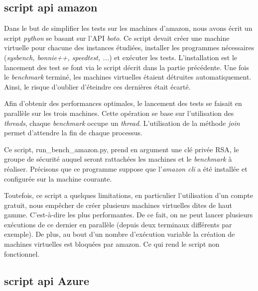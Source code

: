 \documentclass[11pt]{article}
\begin{document}
\subsection{script api amazon}
Dans le but de simplifier les tests sur les machines d'amazon,
nous avons écrit un script \textit{python} se basant sur l'API
\textit{boto}. Ce script devait créer une machine virtuelle pour chacune des instances étudiées, installer les programmes nécessaires (\textit{sysbench, bonnie++, speedtest, ...}) et exécuter les tests. L'installation est le lancement des test se font via le script décrit dans la partie précédente. Une fois le \textit{benchmark} terminé, les machines virtuelles étaient détruites automatiquement. Ainsi, le risque d'oublier d'éteindre ces dernières était écarté.

Afin d'obtenir des performances optimales, le lancement des tests se faisait en parallèle sur les trois machines. Cette opération se base sur l'utilisation des \textit{threads}, chaque \textit{benchmark} occupe un \textit{thread}. L'utilisation de la méthode \textit{join} permet d'attendre la fin de chaque processus.

Ce script, run\_bench\_amazon.py, prend en argument une clé privée RSA, le groupe de sécurité auquel seront rattachées les machines et le \textit{benchmark} à réaliser. Précisons que ce programme suppose que l'\textit{amazon cli} a été installée et configurée sur la machine courante.

Toutefois, ce script a quelques limitations, en particulier l'utilisation d'un compte gratuit, nous empêcher de créer plusieurs machines virtuelles dites de haut gamme. C'est-à-dire les plus performantes. De ce fait, on ne peut lancer plusieurs exécutions de ce dernier en parallèle (depuis deux terminaux différents par exemple). De plus, au bout d'un nombre d'exécution variable la création de machines virtuelles est bloquées par amazon. Ce qui rend le script non fonctionnel.
\subsection{script api Azure}
\end{document}
